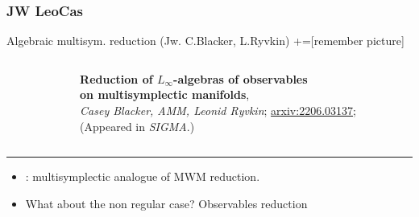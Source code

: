 \documentclass[handout,10pt]{beamer}
\newcommand{\extrarule}{
		{
			\color{UniGreen}
			\par\hspace*{-\dimexpr0.5\paperwidth-0.5\textwidth}\rule[0.5\baselineskip]{\paperwidth}{0.4pt}
			\vspace{-2em}
		}
}
\begin{document}
\subsubsection{JW LeoCas}
	\begin{frame}[t,fragile]{Algebraic multisym. reduction (Jw. C.Blacker, L.Ryvkin)}
	+=[remember picture]
		\begin{columns}[T]
			\begin{column}{0.2\textwidth}
				\centering
			\end{column}		
			\begin{column}{0.8\textwidth}
				\centering
				\textbf{Reduction of $L_\infty$-algebras of observables\\ on multisymplectic manifolds},
				\\
				\emph{Casey Blacker, AMM, Leonid Ryvkin}; \href{https://arxiv.org/abs/2206.03137}{arxiv:2206.03137};\\
				(Appeared in \emph{SIGMA}.)	
			\end{column}		
		\end{columns}
		\extrarule
		
		\vfill
		\begin{itemize}
			\item \cite{Blacker2020}: multisymplectic analogue of MWM reduction.
			\item What about the non regular case? \quad \alert{Observables reduction}
		\end{itemize}		
		\vfill
		\pause
		

\end{frame}
\end{document}
